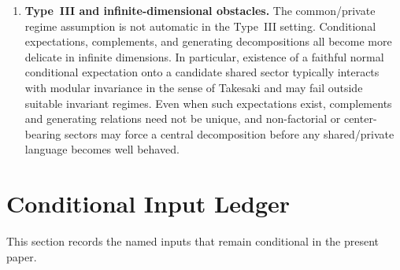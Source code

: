 \documentclass[12pt]{article}
\theoremstyle{definition}
\theoremstyle{remark}
\begin{document}
\begin{enumerate}
\item \textbf{Type~III and infinite-dimensional obstacles.} The
  common/private regime assumption is not automatic in the Type~III
  setting. Conditional expectations, complements, and generating
  decompositions all become more delicate in infinite dimensions. In
  particular, existence of a faithful normal conditional expectation
  onto a candidate shared sector typically interacts with modular
  invariance in the sense of Takesaki and may fail outside suitable
  invariant regimes. Even when such expectations exist, complements and
  generating relations need not be unique, and non-factorial or
  center-bearing sectors may force a central decomposition before any
  shared/private language becomes well behaved.
\end{enumerate}

\section{Conditional Input Ledger}\label{sec:ledger}

This section records the named inputs that remain conditional in the
present paper.
\end{document}
